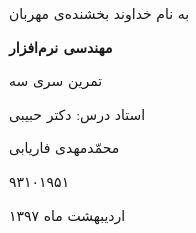 \begin{center}
\large
به نام خداوند بخشنده‌ی مهربان

\Huge
\vspace*{4cm}
\textbf{مهندسی نرم‌افزار}

\vspace*{1cm}
\large
تمرین سری سه
\vspace*{3cm}

\Large
استاد درس: دکتر حبیبی
\vspace*{2cm}

\vspace*{1cm}

 محمّدمهدی فاریابی
 
۹۳۱۰۱۹۵۱
\vspace*{3cm}
\large

اردیبهشت ماه ۱۳۹۷
\vspace*{5cm}

\end{center}
\newpage

